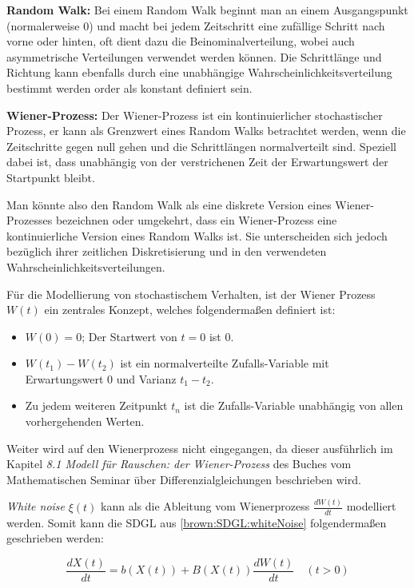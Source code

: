 \textbf{Random Walk:}
Bei einem Random Walk beginnt man an einem Ausgangspunkt (normalerweise 0) und macht bei jedem Zeitschritt eine zufällige Schritt nach vorne oder hinten, oft dient dazu die Beinominalverteilung, wobei auch asymmetrische Verteilungen verwendet werden können. Die Schrittlänge und Richtung kann ebenfalls durch eine unabhängige Wahrscheinlichkeitsverteilung bestimmt werden order als konstant definiert sein.

\textbf{Wiener-Prozess:}
Der Wiener-Prozess ist ein kontinuierlicher stochastischer Prozess, er kann als Grenzwert eines Random Walks betrachtet werden, wenn die Zeitschritte gegen null gehen und die Schrittlängen normalverteilt sind. Speziell dabei ist, dass unabhängig von der verstrichenen Zeit der Erwartungswert der Startpunkt bleibt.

Man könnte also den Random Walk als eine diskrete Version eines Wiener-Prozesses bezeichnen oder umgekehrt, dass ein Wiener-Prozess eine kontinuierliche Version eines Random Walks ist. Sie unterscheiden sich jedoch bezüglich ihrer zeitlichen Diskretisierung und in den verwendeten Wahrscheinlichkeitsverteilungen.

Für die Modellierung von stochastischem Verhalten, ist der Wiener Prozess $ W(t) $ ein zentrales Konzept, welches folgendermaßen definiert ist:
\begin{itemize}
	\item $ W(0) = 0 $; Der Startwert von $ t = 0 $ ist 0.
	\item $ W(t_{1}) - W(t_{2}) $ ist ein normalverteilte Zufalls-Variable mit Erwartungswert 0 und Varianz $ t_{1} - t_{2} $.
	\item Zu jedem weiteren Zeitpunkt $ t_{n} $ ist die Zufalls-Variable unabhängig von allen vorhergehenden Werten.
\end{itemize}

Weiter wird auf den Wienerprozess nicht eingegangen, da dieser ausführlich im Kapitel \glqq \textit{8.1 Modell für Rauschen: der Wiener-Prozess}\glqq{} des Buches vom Mathematischen Seminar über Differenzialgleichungen beschrieben wird.

\textit{White noise} $ \xi(t) $ kann als die Ableitung vom Wienerprozess $ \frac{dW(t)}{dt} $ modelliert werden. Somit kann die SDGL aus \ref{brown:SDGL:whiteNoise} folgendermaßen geschrieben werden:

\begin{equation}
	\frac{dX(t)}{dt} = b(X(t)) + B(X(t)) \frac{dW(t)}{dt} \quad (t>0)
\end{equation}

